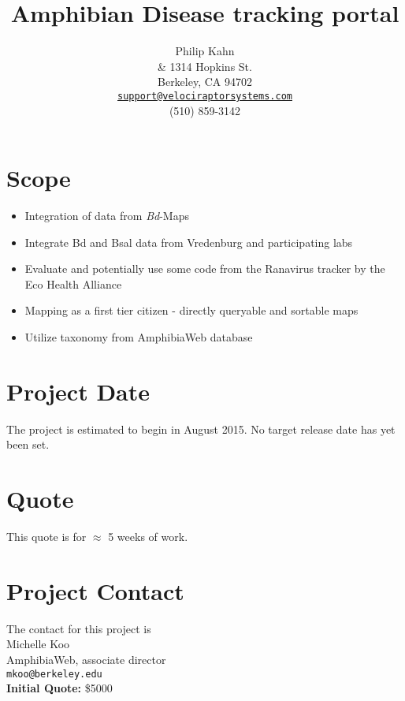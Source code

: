 \documentclass{article}
\begin{document}
\title{Amphibian Disease tracking portal}

\author{
  \centering
  Philip Kahn\\
  & 1314 Hopkins St.\\
  Berkeley, CA 94702\\
  {\tt \href{mailto:support@velociraptorsystems.com}{support@velociraptorsystems.com}} \\
  (510) 859-3142 \\
  }

\maketitle


\section{Scope}

\begin{itemize}
  \item Integration of data from \textit{Bd}-Maps
  \item Integrate Bd and Bsal data from Vredenburg and participating labs
  \item Evaluate and potentially use some code from the Ranavirus tracker by the Eco Health Alliance
  \item Mapping as a first tier citizen - directly queryable and sortable maps
  \item Utilize taxonomy from AmphibiaWeb database
\end{itemize}

\section{Project Date}

The project is estimated to begin in  August 2015. No target release date has yet been set.

\section{Quote}

This quote is for $\approx$ 5 weeks of work.

\section{Project Contact}

The contact for this project is\\

\noindent Michelle Koo\\
AmphibiaWeb, associate director\\
{\tt mkoo@berkeley.edu}\\



\noindent \textbf{Initial Quote:} \$5000
\end{document}
